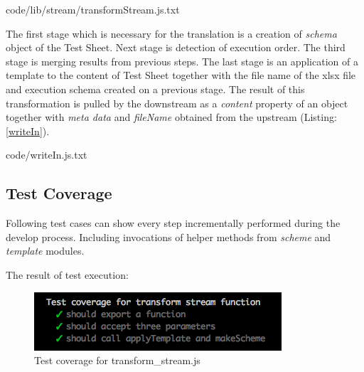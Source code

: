 
{code/lib/stream/transformStream.js.txt}

The first stage which is necessary for the translation is a creation of \textit{schema} object of the Test Sheet. Next stage is detection of execution order. The third stage is merging results from previous steps. The last stage is an application of a template to the content of Test Sheet together with the file name of the xlsx file and execution schema created on a previous stage. The result of this transformation is pulled by the downstream as a \textit{content} property of an object together with \textit{meta data} and \textit{fileName} obtained from the upstream (Listing: \ref{writeIn}).


{code/writeIn.js.txt}

\subsection{Test Coverage}
Following test cases can show every step incrementally performed during the develop process. Including invocations of helper methods from \textit{scheme} and \textit{template} modules.
%

The result of test execution:
\begin{figure}[H]
	\centering
	\includegraphics[width=\linewidth]{grafiken/testTransform.png}
	\caption{Test coverage for transform\_stream.js}
	\label{fig:testTransofm}
\end{figure}

